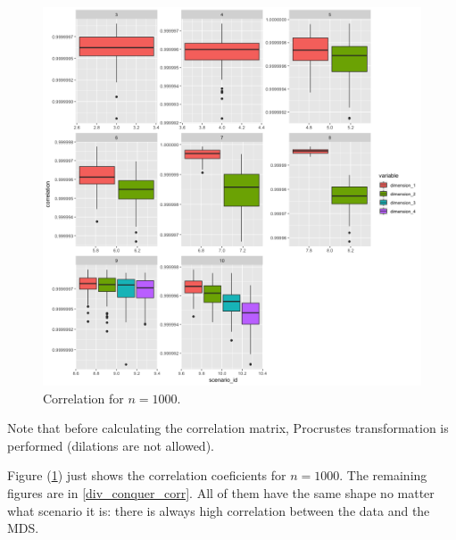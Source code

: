 \documentclass[11pt]{report}
\begin{document}
\begin{figure}[ht]
\centering
    \includegraphics{./images/divide_correlation_1000.png}
    \caption{Correlation for $n = 1000$.}
    \label{divide_correlation_1000}
\end{figure}

\indent Note that before calculating the correlation matrix, Procrustes 
transformation is performed (dilations are not allowed). 

\indent Figure (\ref{divide_correlation_1000}) just shows the correlation
coeficients for $n = 1000$. The remaining figures are in 
\autoref{div_conquer_corr}. All of them have the same shape no matter what
scenario it is: there is always high correlation between the data 
and the MDS.
\end{document}
